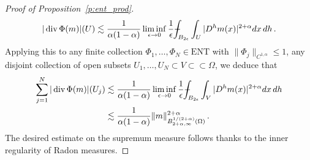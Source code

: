 \documentclass[fleqn
]{article}
\numberwithin{equation}{section}
\newcommand{\e}{\epsilon}
\DeclareMathOperator{\dv}{div}
\def\Xint#1{\mathchoice
	{\XXint\displaystyle\textstyle{#1}}%
	{\XXint\textstyle\scriptstyle{#1}}%
	{\XXint\scriptstyle\scriptscriptstyle{#1}}%
	{\XXint\scriptscriptstyle\scriptscriptstyle{#1}}%
	\!\int}
\def\XXint#1#2#3{{\setbox0=\hbox{$#1{#2#3}{\int}$}
		\vcenter{\hbox{$#2#3$}}\kern-.5\wd0}}
\theoremstyle{definition}
\begin{document}
\begin{proof}[Proof of Proposition~\ref{p:ent_prod}]
\begin{align*}
|\dv\Phi(m)|(U)\lesssim
\frac{1}{\alpha(1-\alpha)}
\liminf_{\e\to 0}
\frac{1}{\e}
  \Xint{-}_{B_{2\e}}
\int_{U} |D^h m(x)|^{2+\alpha}dx\, dh\,.
\end{align*}
Applying this to any finite collection $\Phi_1,\ldots,\Phi_N\in\mathrm{ENT}$ with $\|\Phi_j\|_{C^{1,\alpha}}\leq 1$,
any disjoint collection of open subsets 
$U_1,\ldots,U_N\subset V\subset\subset\Omega$, 
we deduce that
\begin{align*}
\sum_{j=1}^N |\dv\Phi(m)|(U_j) 
&
\lesssim \frac{1}{\alpha(1-\alpha)}
\liminf_{\e\to 0}
\frac{1}{\e}
  \Xint{-}_{B_{2\e}}
\int_{V} |D^h m(x)|^{2+\alpha}dx\, dh
\\
&
\lesssim \frac{1}{\alpha(1-\alpha)}\|m\|^{2+\alpha}_{B^{1/(2+\alpha)}_{2+\alpha,\infty}(\Omega)}\,.
\end{align*}
The desired estimate on the supremum measure follows thanks to the inner regularity of Radon measures.
\end{proof}
\end{document}
